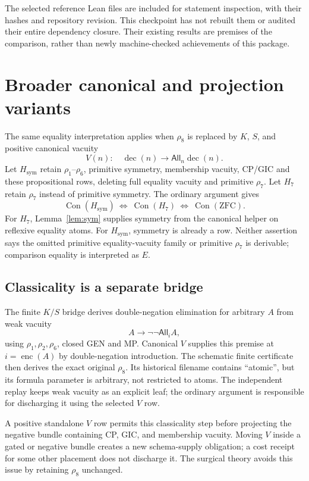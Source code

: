 \documentclass[11pt,letterpaper]{article}
\theoremstyle{definition}\newtheorem{definition}[theorem]{Definition}
\theoremstyle{remark}\newtheorem{remark}[theorem]{Remark}
\newcommand{\All}{\mathsf{All}}
\newcommand{\Con}{\operatorname{Con}}
\newcommand{\enc}{\operatorname{enc}}
\newcommand{\dec}{\operatorname{dec}}
\newcommand{\To}{\rightarrow}
\newcommand{\Hs}{H_{\mathrm{sym}}}
\newcommand{\Hr}{H_7}
\begin{document}
The selected reference Lean files are included for statement inspection, with their hashes and repository revision. This checkpoint has not rebuilt them or audited their entire dependency closure. Their existing results are premises of the comparison, rather than newly machine-checked achievements of this package.

\section{Broader canonical and projection variants}\label{sec:variants}
The same equality interpretation applies when $\rho_8$ is replaced by $K$, $S$, and positive canonical vacuity
\[
 V(n):\quad\dec(n)\To\All_n\dec(n).
\]
Let $\Hs$ retain $\rho_1$--$\rho_6$, primitive symmetry, membership vacuity, CP/GIC and these propositional rows, deleting full equality vacuity and primitive $\rho_7$. Let $\Hr$ retain $\rho_7$ instead of primitive symmetry. The ordinary argument gives
\[
 \Con(\Hs)\ \Longleftrightarrow\ \Con(\Hr)\ \Longleftrightarrow\ \Con(\mathrm{ZFC}).
\]
For $\Hr$, Lemma~\ref{lem:sym} supplies symmetry from the canonical helper on reflexive equality atoms. For $\Hs$, symmetry is already a row. Neither assertion says the omitted primitive equality-vacuity family or primitive $\rho_7$ is derivable; comparison equality is interpreted as $E$.

\subsection{Classicality is a separate bridge}
The finite $K/S$ bridge derives double-negation elimination for arbitrary $A$ from weak vacuity
\[
 A\To\neg\neg\All_iA,
\]
using $\rho_1,\rho_2,\rho_6$, closed GEN and MP. Canonical $V$ supplies this premise at $i=\enc(A)$ by double-negation introduction. The schematic finite certificate then derives the exact original $\rho_8$. Its historical filename contains ``atomic'', but its formula parameter is arbitrary, not restricted to atoms. The independent replay keeps weak vacuity as an explicit leaf; the ordinary argument is responsible for discharging it using the selected $V$ row.

A positive standalone $V$ row permits this classicality step before projecting the negative bundle containing CP, GIC, and membership vacuity. Moving $V$ inside a gated or negative bundle creates a new schema-supply obligation; a cost receipt for some other placement does not discharge it. The surgical theory avoids this issue by retaining $\rho_8$ unchanged.
\end{document}

